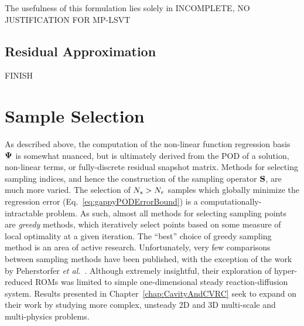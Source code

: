 The usefulness of this formulation lies solely in
{\color{red} INCOMPLETE, NO JUSTIFICATION FOR MP-LSVT}

\subsection{Residual Approximation}
%
{\color{red} FINISH}

\section{Sample Selection}\label{subsec:sampleSelect}

As described above, the computation of the non-linear function regression basis $\deimBasis$ is somewhat nuanced, but is ultimately derived from the POD of a solution, non-linear terms, or fully-discrete residual snapshot matrix. Methods for selecting sampling indices, and hence the construction of the sampling operator $\mathbf{S}$, are much more varied. The selection of $N_s > N_r$ samples which globally minimize the regression error (Eq.~\ref{eq:gappyPODErrorBound}) is a computationally-intractable problem. As such, almost all methods for selecting sampling points are \textit{greedy} methods, which iteratively select points based on some measure of local optimality at a given iteration. The ``best'' choice of greedy sampling method is an area of active research. Unfortunately, very few comparisons between sampling methods have been published, with the exception of the work by Peherstorfer \textit{et al.}~\cite{Peherstorfer2020}. Although extremely insightful, their exploration of hyper-reduced ROMs was limited to simple one-dimensional steady reaction-diffusion system. Results presented in Chapter~\ref{chap:CavityAndCVRC} seek to expand on their work by studying more complex, unsteady 2D and 3D multi-scale and multi-physics problems.

